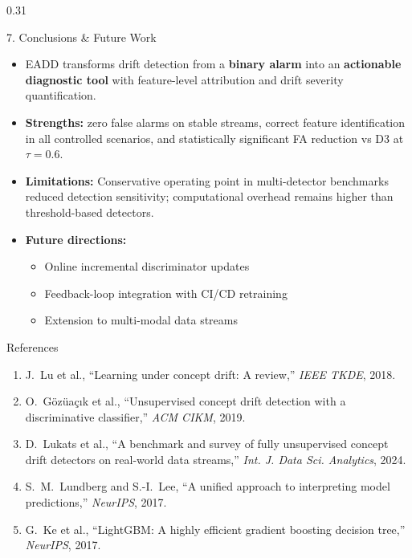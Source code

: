 \documentclass[final]{beamer}
\begin{document}
\begin{frame}[t]
\begin{columns}[t]
\begin{column}{0.31\textwidth}
\vskip1cm

\begin{block}{7. Conclusions \& Future Work}
\begin{itemize}
  \item EADD transforms drift detection from a \textbf{binary alarm} into an \textbf{actionable diagnostic tool} with feature-level attribution and drift severity quantification.
  \item \textbf{Strengths:} zero false alarms on stable streams, correct feature identification in all controlled scenarios, and statistically significant FA reduction vs D3 at $\tau=0.6$.
  \item \textbf{Limitations:} Conservative operating point in multi-detector benchmarks reduced detection sensitivity; computational overhead remains higher than threshold-based detectors.
  \item \textbf{Future directions:}
  \begin{itemize}
    \item Online incremental discriminator updates
    \item Feedback-loop integration with CI/CD retraining
    \item Extension to multi-modal data streams
  \end{itemize}
\end{itemize}
\end{block}

\vskip1cm

\begin{block}{References}
\small
\begin{enumerate}
  \item J.~Lu et al., ``Learning under concept drift: A review,'' \textit{IEEE TKDE}, 2018.
  \item O.~G\"{o}z\"{u}a\c{c}{\i}k et al., ``Unsupervised concept drift detection with a discriminative classifier,'' \textit{ACM CIKM}, 2019.
  \item D.~Lukats et al., ``A benchmark and survey of fully unsupervised concept drift detectors on real-world data streams,'' \textit{Int. J. Data Sci. Analytics}, 2024.
  \item S.~M.~Lundberg and S.-I.~Lee, ``A unified approach to interpreting model predictions,'' \textit{NeurIPS}, 2017.
  \item G.~Ke et al., ``LightGBM: A highly efficient gradient boosting decision tree,'' \textit{NeurIPS}, 2017.
\end{enumerate}
\end{block}

\end{column}
\end{columns}

\end{frame}
\end{document}
